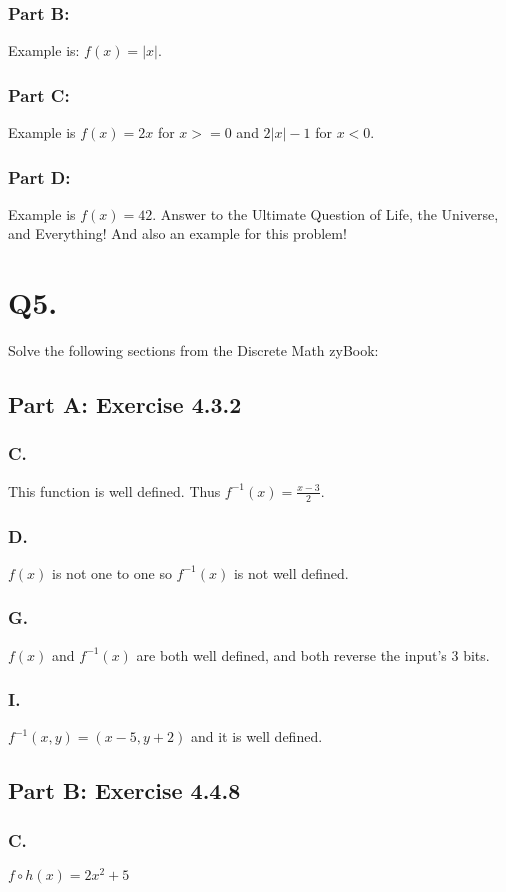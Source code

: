 \documentclass[titlepage]{article}\pagestyle{empty}
\begin{document}
\subsubsection*{Part B:}
Example is: $f(x) = |x|$.
\subsubsection*{Part C:}
Example is $f(x) = 2x$ for $x >= 0$ and $2|x|-1$ for $x < 0$.
\subsubsection*{Part D:}
Example is $f(x) = 42$. Answer to the Ultimate Question of Life, the Universe, and Everything! And also an example for this problem!

\pagebreak
\section*{Q5.} Solve the following sections from the Discrete Math zyBook:
\subsection*{Part A: Exercise 4.3.2} 
\subsubsection*{C.} This function is well defined. Thus $f^{-1}(x)=\frac{x-3}{2}$.
\subsubsection*{D.} $f(x)$ is not one to one so $f^{-1}(x)$ is not well defined.
\subsubsection*{G.} $f(x)$ and $f^{-1}(x)$ are both well defined, and both reverse the input's 3 bits. 
\subsubsection*{I.} $f^{-1}(x,y) = (x - 5, y+2)$ and it is well defined.
\subsection*{Part B: Exercise 4.4.8}
\subsubsection*{C.} $f \circ h(x) = 2x^2 + 5$
\end{document}
